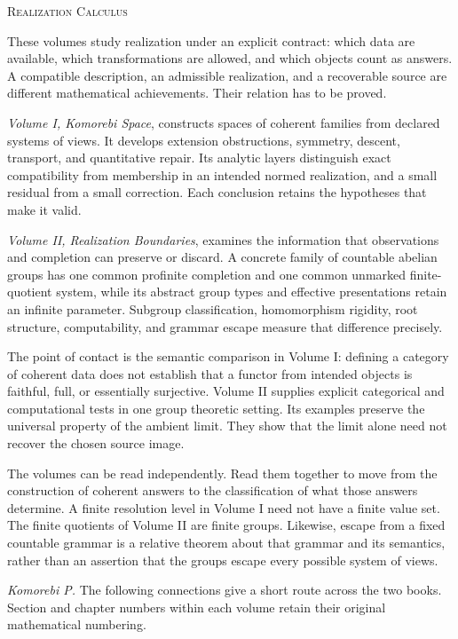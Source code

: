 \noindent\textsc{Realization Calculus}\par\medskip
These volumes study realization under an explicit contract: which data are available, which transformations are allowed, and which objects count as answers. A compatible description, an admissible realization, and a recoverable source are different mathematical achievements. Their relation has to be proved.

\emph{Volume I, Komorebi Space}, constructs spaces of coherent families from declared systems of views. It develops extension obstructions, symmetry, descent, transport, and quantitative repair. Its analytic layers distinguish exact compatibility from membership in an intended normed realization, and a small residual from a small correction. Each conclusion retains the hypotheses that make it valid.

\emph{Volume II, Realization Boundaries}, examines the information that observations and completion can preserve or discard. A concrete family of countable abelian groups has one common profinite completion and one common unmarked finite-quotient system, while its abstract group types and effective presentations retain an infinite parameter. Subgroup classification, homomorphism rigidity, root structure, computability, and grammar escape measure that difference precisely.

The point of contact is the semantic comparison in Volume I: defining a category of coherent data does not establish that a functor from intended objects is faithful, full, or essentially surjective. Volume II supplies explicit categorical and computational tests in one group theoretic setting. Its examples preserve the universal property of the ambient limit. They show that the limit alone need not recover the chosen source image.

The volumes can be read independently. Read them together to move from the construction of coherent answers to the classification of what those answers determine. A finite resolution level in Volume I need not have a finite value set. The finite quotients of Volume II are finite groups. Likewise, escape from a fixed countable grammar is a relative theorem about that grammar and its semantics, rather than an assertion that the groups escape every possible system of views.

\vfill\noindent\textit{Komorebi P.}
\clearpage
{}
\noindent The following connections give a short route across the two books. Section and chapter numbers within each volume retain their original mathematical numbering.

